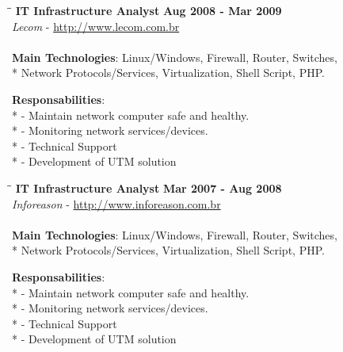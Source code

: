 \documentclass[margin]{res}
\begin{document}
\begin{resume}
\vspace{-0.1in}
\begin{tabbing}
  \hspace{2.3in}\= \hspace{1.7in}\= \kill %
  \textbf{IT Infrastructure Analyst}    \>\>\textbf{Aug 2008 - Mar 2009}\\
  \textit{Lecom} - \url{http://www.lecom.com.br}\\\\
  \textbf{Main Technologies}: Linux/Windows, Firewall, Router, Switches,\\* 
  Network Protocols/Services, Virtualization, Shell Script, PHP.
\end{tabbing}\vspace{-20pt}      %
\vspace{2mm}\textbf{Responsabilities}: \\*
  - Maintain network computer safe and healthy. \\*
  - Monitoring network services/devices. \\*
  - Technical Support \\*
  - Development of UTM solution\\

\vspace{-0.1in}
\begin{tabbing}
  \hspace{2.3in}\= \hspace{1.7in}\= \kill %
  \textbf{IT Infrastructure Analyst}    \>\>\textbf{Mar 2007 - Aug 2008}\\
  \textit{Inforeason} - \url{http://www.inforeason.com.br}\\\\
  \textbf{Main Technologies}: Linux/Windows, Firewall, Router, Switches,\\* 
  Network Protocols/Services, Virtualization, Shell Script, PHP.
\end{tabbing}\vspace{-20pt}      %
\vspace{2mm}\textbf{Responsabilities}: \\*
  - Maintain network computer safe and healthy. \\*
  - Monitoring network services/devices. \\*
  - Technical Support \\*
  - Development of UTM solution\\


\end{resume}
\end{document}
